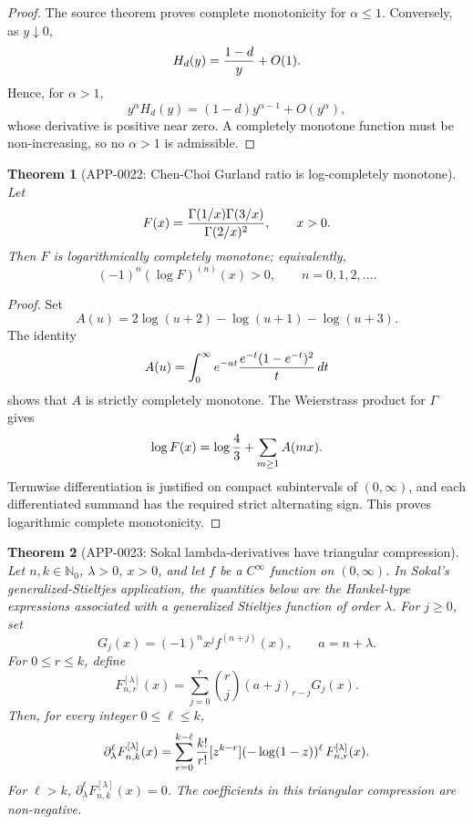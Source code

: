 \documentclass[11pt]{article}
\numberwithin{equation}{section}
\newtheorem{theorem}{Theorem}[section]
\theoremstyle{definition}
\theoremstyle{remark}
\newcommand{\1}{\mathbf 1}
\begin{document}
\begin{proof}
The source theorem proves complete monotonicity for \(\alpha\le1\).  Conversely,
as \(y\downarrow0\),
\[
  H_d(y)={1-d\over y}+O(1).
\]
Hence, for \(\alpha>1\),
\[
  y^\alpha H_d(y)=(1-d)y^{\alpha-1}+O(y^\alpha),
\]
whose derivative is positive near zero.  A completely monotone function must be
non-increasing, so no \(\alpha>1\) is admissible.
\end{proof}

\begin{theorem}[APP-0022: Chen-Choi Gurland ratio is log-completely monotone]
\label{thm:app22-gurland-logcm}
Let
\[
  F(x)={\Gamma(1/x)\Gamma(3/x)\over \Gamma(2/x)^2},\qquad x>0.
\]
Then \(F\) is logarithmically completely monotone; equivalently,
\[
  (-1)^n(\log F)^{(n)}(x)>0,\qquad n=0,1,2,\ldots .
\]
\end{theorem}

\begin{proof}
Set
\[
  A(u)=2\log(u+2)-\log(u+1)-\log(u+3).
\]
The identity
\[
 A(u)=\int_0^\infty e^{-ut}{e^{-t}(1-e^{-t})^2\over t}\,dt
\]
shows that \(A\) is strictly completely monotone.  The Weierstrass product for
\(\Gamma\) gives
\[
  \log F(x)=\log {4\over3}+\sum_{m\ge1}A(mx).
\]
Termwise differentiation is justified on compact subintervals of
\((0,\infty)\), and each differentiated summand has the required strict
alternating sign.  This proves logarithmic complete monotonicity.
\end{proof}

\begin{theorem}[APP-0023: Sokal lambda-derivatives have triangular compression]
\label{thm:app23-sokal-lambda}
Let \(n,k\in\mathbb N_0\), \(\lambda>0\), \(x>0\), and let \(f\) be a
\(C^\infty\) function on \((0,\infty)\).  In Sokal's generalized-Stieltjes
application, the quantities below are the Hankel-type expressions associated
with a generalized Stieltjes function of order \(\lambda\).  For \(j\ge0\), set
\[
  G_j(x)=(-1)^n x^j f^{(n+j)}(x),\qquad a=n+\lambda .
\]
For \(0\le r\le k\), define
\[
  F^{[\lambda]}_{n,r}(x)
   =\sum_{j=0}^r {r\choose j}(a+j)_{r-j}G_j(x).
\]
Then, for every integer \(0\le\ell\le k\),
\[
 \partial_\lambda^\ell F^{[\lambda]}_{n,k}(x)
 =\sum_{r=0}^{k-\ell}{k!\over r!}
   [z^{k-r}](-\log(1-z))^\ell\,F^{[\lambda]}_{n,r}(x).
\]
For \(\ell>k\), \(\partial_\lambda^\ell F^{[\lambda]}_{n,k}(x)=0\).  The
coefficients in this triangular compression are non-negative.
\end{theorem}
\end{document}
